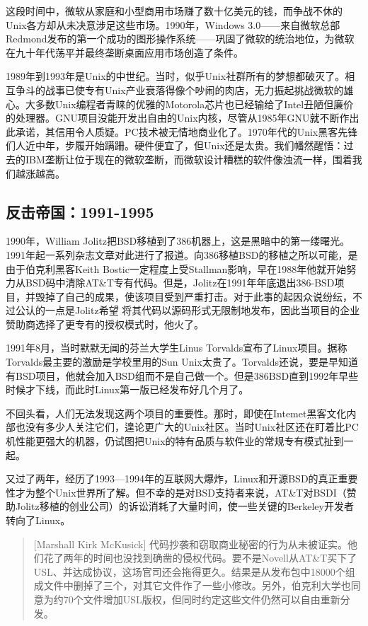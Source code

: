 \documentclass[12pt,oneside]{book}
\begin{document}
\begin{common-format}
这段时间中，微软从家庭和小型商用市场赚了数十亿美元的钱，而争战不休的Unix各方却从未决意涉足这些市场。1990年，Windows 3.0——来自微软总部Redmond发布的第一个成功的图形操作系统——巩固了微软的统治地位，为微软在九十年代荡平并最终垄断桌面应用市场创造了条件。

1989年到1993年是Unix的中世纪。当时，似乎Unix社群所有的梦想都破灭了。相互争斗的战事已使专有Unix产业衰落得像个吵闹的肉店，无力振起挑战微软的雄心。大多数Unix编程者青睐的优雅的Motorola芯片也已经输给了Intel丑陋但廉价的处理器。GNU项目没能开发出自由的Unix内核，尽管从1985年GNU就不断作出此承诺，其信用令人质疑。PC技术被无情地商业化了。1970年代的Unix黑客先锋们人近中年，步履开始蹒跚。硬件便宜了，但Unix还是太贵。我们幡然醒悟：过去的IBM垄断让位于现在的微软垄断，而微软设计糟糕的软件像浊流一样，围着我们越涨越高。

\subsection{反击帝国：1991-1995}
1990年，William Jolitz把BSD移植到了386机器上，这是黑暗中的第一缕曙光。1991年起一系列杂志文章对此进行了报道。向386移植BSD的移植之所以可能，是由于伯克利黑客Keith Bostic一定程度上受Stallman影响，早在1988年他就开始努力从BSD码中清除AT\&{}T专有代码。但是，Jolitz在1991年年底退出386-BSD项目，并毁掉了自己的成果，使该项目受到严重打击。对于此事的起因众说纷纭，不过公认的一点是Jolitz希望
将其代码以源码形式无限制地发布，因此当项目的企业赞助商选择了更专有的授权模式时，他火了。

1991年8月，当时默默无闻的芬兰大学生Linus Torvalds宣布了Linux项目。据称Torvalds最主要的激励是学校里用的Sun Unix太贵了。Torvalds还说，要是早知道有BSD项目，他就会加入BSD组而不是自己做一个。但是386BSD直到1992年早些时候才下线，而此时Linux第一版已经发布好几个月了。

不回头看，人们无法发现这两个项目的重要性。那时，即使在Intemet黑客文化内部也没有多少人关注它们，遑论更广大的Unix社区。当时Unix社区还在盯着比PC机性能更强大的机器，仍试图把Unix的特有品质与软件业的常规专有模式扯到一起。

又过了两年，经历了1993—1994年的互联网大爆炸，Linux和开源BSD的真正重要性才为整个Unix世界所了解。但不幸的是对BSD支持者来说，AT\&{}T对BSDI（赞助Jolitz移植的创业公司）的诉讼消耗了大量时间，使一些关键的Berkeley开发者转向了Linux。

\begin{quote}[Marshall Kirk McKusick]
代码抄袭和窃取商业秘密的行为从未被证实。他们花了两年的时间也没找到确凿的侵权代码。要不是Novell从AT\&{}T买下了USL、并达成协议，这场官司还会拖得更久。结果是从发布包中18000个组成文件中删掉了三个，对其它文件作了一些小修改。另外，伯克利大学也同意为约70个文件增加USL版权，但同时约定这些文件仍然可以自由重新分发。
\end{quote}


\end{common-format}
\end{document}

